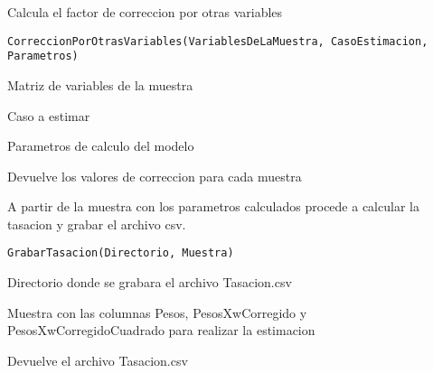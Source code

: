 \documentclass[a4paper]{book}
\begin{document}
%
\begin{Description}\relax
Calcula el factor de correccion por otras variables
\end{Description}
%
\begin{Usage}
\begin{verbatim}
CorreccionPorOtrasVariables(VariablesDeLaMuestra, CasoEstimacion, Parametros)
\end{verbatim}
\end{Usage}
%
\begin{Arguments}
\begin{ldescription}
\item[\code{VariablesDeLaMuestra}] Matriz de variables de la muestra
\item[\code{CasoEstimacion}] Caso a estimar
\item[\code{Parametros}] Parametros de calculo del modelo
\end{ldescription}
\end{Arguments}
%
\begin{Value}
Devuelve los valores de correccion para cada muestra
\end{Value}
%
\begin{Description}\relax
A partir de la muestra con los parametros calculados procede a calcular la tasacion y grabar el archivo csv.
\end{Description}
%
\begin{Usage}
\begin{verbatim}
GrabarTasacion(Directorio, Muestra)
\end{verbatim}
\end{Usage}
%
\begin{Arguments}
\begin{ldescription}
\item[\code{Directorio}] Directorio donde se grabara el archivo Tasacion.csv
\item[\code{Muestra}] Muestra con las columnas Pesos, PesosXwCorregido y PesosXwCorregidoCuadrado para realizar la estimacion
\end{ldescription}
\end{Arguments}
%
\begin{Value}
Devuelve el archivo Tasacion.csv
\end{Value}
\end{document}
